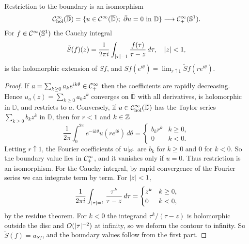 \begin{proposition}\label{index:prop:hardy}
  Restriction to the boundary is an isomorphism
  \begin{equation*}
    \mathcal{C}^\infty_{\mathrm{hol}}(\overline{\mathbb D})=\{u\in\mathcal{C}^\infty(\overline{\mathbb D});\
    \bar\partial u=0\text{ in }\mathbb D\}\longrightarrow\mathcal{C}^\infty_{+}(\mathbb{S}^1).
  \end{equation*}
  For $f\in\mathcal{C}^\infty(\mathbb{S}^1)$ the Cauchy integral
  \begin{equation*}
    \tilde S(f)(z)=\frac1{2\pi i}\int_{\lvert \tau\rvert=1}\frac{f(\tau)}{\tau-z}\,d\tau,
    \quad\lvert z\rvert<1,
  \end{equation*}
  is the holomorphic extension of $Sf$, and
  $Sf(e^{i\theta})=\lim_{r\uparrow1}\tilde Sf(re^{i\theta})$.
\end{proposition}
\begin{proof}
  If $a=\sum_{k\ge0}a_ke^{ik\theta}\in\mathcal{C}^\infty_{+}$ then the coefficients are
  rapidly decreasing. Hence $u_a(z)=\sum_{k\ge0}a_kz^k$ converges on
  $\overline{\mathbb D}$ with all derivatives, is holomorphic in $\mathbb D$,
  and restricts to $a$. Conversely, if $u\in\mathcal{C}^\infty_{\mathrm{hol}}(\overline{\mathbb
  D})$ has the Taylor series $\sum_{k\ge0}b_kz^k$ in $\mathbb D$, then for
  $r<1$ and $k\in\mathbb{Z}$
  \begin{equation*}
    \frac1{2\pi}\int_0^{2\pi}e^{-ik\theta}u(re^{i\theta})\,d\theta=
    \begin{cases}b_kr^k&k\ge0,\\0&k<0.\end{cases}
  \end{equation*}
  Letting $r\uparrow1$, the Fourier coefficients of $u|_{\mathbb{S}^1}$ are $b_k$
  for $k\ge0$ and $0$ for $k<0$. So the boundary value lies in $\mathcal{C}^\infty_{+}$, and
  it vanishes only if $u=0$. Thus restriction is an isomorphism. For the
  Cauchy integral, by rapid convergence of the Fourier series we can integrate
  term by term. For $\lvert z\rvert<1$,
  \begin{equation*}
    \frac1{2\pi i}\int_{\lvert \tau\rvert=1}\frac{\tau^k}{\tau-z}\,d\tau=
    \begin{cases}z^k&k\ge0,\\0&k<0,\end{cases}
  \end{equation*}
  by the residue theorem. For $k<0$ the integrand $\tau^k/(\tau-z)$ is
  holomorphic outside the disc and $O(\lvert \tau\rvert^{-2})$ at infinity, so we
  deform the contour to infinity. So $\tilde S(f)=u_{Sf}$, and the boundary
  values follow from the first part.
\end{proof}


